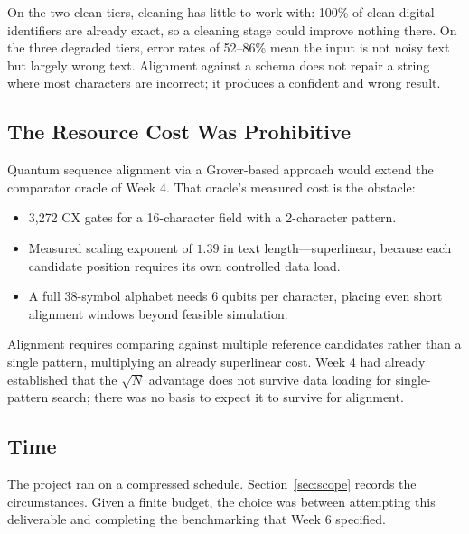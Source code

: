 \documentclass[11pt,a4paper]{article}
\begin{document}
On the two clean tiers, cleaning has little to work with: 100\% of clean digital
identifiers are already exact, so a cleaning stage could improve nothing there.
On the three degraded tiers, error rates of 52--86\% mean the input is not noisy
text but largely wrong text. Alignment against a schema does not repair a string
where most characters are incorrect; it produces a confident and wrong result.

\subsection{The Resource Cost Was Prohibitive}

Quantum sequence alignment via a Grover-based approach would extend the
comparator oracle of Week 4. That oracle's measured cost is the obstacle:

\begin{itemize}
\item 3{,}272 CX gates for a 16-character field with a 2-character pattern.
\item Measured scaling exponent of $1.39$ in text length---superlinear, because
      each candidate position requires its own controlled data load.
\item A full 38-symbol alphabet needs 6 qubits per character, placing even short
      alignment windows beyond feasible simulation.
\end{itemize}

Alignment requires comparing against multiple reference candidates rather than a
single pattern, multiplying an already superlinear cost. Week 4 had already
established that the $\sqrt{N}$ advantage does not survive data loading for
single-pattern search; there was no basis to expect it to survive for alignment.

\subsection{Time}

The project ran on a compressed schedule. Section~\ref{sec:scope} records the
circumstances. Given a finite budget, the choice was between attempting this
deliverable and completing the benchmarking that Week 6 specified.

\end{document}
